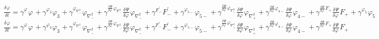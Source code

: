 $\frac{{\delta}^{} \varphi_{{}}}{{\delta} {t}^{}} = {\gamma}^{{{\varphi_{{}}}^{}}}{{\varphi_{{}}}^{}} + {\gamma}^{{{\varphi_{3{}}}^{}}}{{\varphi_{3{}}}^{}} + {\gamma}^{{{{\varphi}_{\scriptscriptstyle{\nabla^2_{-}}}}^{}}}{{{\varphi}_{\scriptscriptstyle{\nabla^2_{-}}}}^{}} + {\gamma}^{{{\frac{{\delta}^{} \Psi}{{\delta} {\varphi_{{}}}^{}}}^{}{{\varphi}_{\scriptscriptstyle{\nabla^2_{-}}}}^{}}}{{\frac{{\delta}^{} \Psi}{{\delta} {\varphi_{{}}}^{}}}^{}{{\varphi}_{\scriptscriptstyle{\nabla^2_{-}}}}^{}} + {\gamma}^{{{{{F}^{\prime}_{-}}}^{}}}{{{{F}^{\prime}_{-}}}^{}} + {\gamma}^{{{{\varphi}_{5{-}}}^{}}}{{{\varphi}_{5{-}}}^{}} + {\gamma}^{{{\frac{{\delta}^{} \Psi}{{\delta} {\varphi_{{}}}^{}}}^{}{\varphi_{\scriptscriptstyle{\nabla^2_{+}}}}^{}}}{{\frac{{\delta}^{} \Psi}{{\delta} {\varphi_{{}}}^{}}}^{}{\varphi_{\scriptscriptstyle{\nabla^2_{+}}}}^{}} + {\gamma}^{{{\frac{{\delta}^{} \Psi}{{\delta} {\varphi_{{}}}^{}}}^{}{{\varphi}_{4{-}}}^{}}}{{\frac{{\delta}^{} \Psi}{{\delta} {\varphi_{{}}}^{}}}^{}{{\varphi}_{4{-}}}^{}} + {\gamma}^{{{\frac{{\delta}^{} \Psi}{{\delta} {\varphi_{{}}}^{}}}^{}{{F_{+}}}^{}}}{{\frac{{\delta}^{} \Psi}{{\delta} {\varphi_{{}}}^{}}}^{}{{F_{+}}}^{}} + {\gamma}^{{{\varphi_{5{}}}^{}}}{{\varphi_{5{}}}^{}}$
$\frac{{\delta}^{} \varphi_{{}}}{{\delta} {t}^{}} = {\gamma}^{{{\varphi_{{}}}^{}}}{{\varphi_{{}}}^{}} + {\gamma}^{{{\varphi_{3{}}}^{}}}{{\varphi_{3{}}}^{}} + {\gamma}^{{{{\varphi}_{\scriptscriptstyle{\nabla^2_{-}}}}^{}}}{{{\varphi}_{\scriptscriptstyle{\nabla^2_{-}}}}^{}} + {\gamma}^{{{\frac{{\delta}^{} \Psi}{{\delta} {\varphi_{{}}}^{}}}^{}{{\varphi}_{\scriptscriptstyle{\nabla^2_{-}}}}^{}}}{{\frac{{\delta}^{} \Psi}{{\delta} {\varphi_{{}}}^{}}}^{}{{\varphi}_{\scriptscriptstyle{\nabla^2_{-}}}}^{}} + {\gamma}^{{{{{F}^{\prime}_{-}}}^{}}}{{{{F}^{\prime}_{-}}}^{}} + {\gamma}^{{{{\varphi}_{5{-}}}^{}}}{{{\varphi}_{5{-}}}^{}} + {\gamma}^{{{\frac{{\delta}^{} \Psi}{{\delta} {\varphi_{{}}}^{}}}^{}{\varphi_{\scriptscriptstyle{\nabla^2_{+}}}}^{}}}{{\frac{{\delta}^{} \Psi}{{\delta} {\varphi_{{}}}^{}}}^{}{\varphi_{\scriptscriptstyle{\nabla^2_{+}}}}^{}} + {\gamma}^{{{\frac{{\delta}^{} \Psi}{{\delta} {\varphi_{{}}}^{}}}^{}{{\varphi}_{4{-}}}^{}}}{{\frac{{\delta}^{} \Psi}{{\delta} {\varphi_{{}}}^{}}}^{}{{\varphi}_{4{-}}}^{}} + {\gamma}^{{{\frac{{\delta}^{} \Psi}{{\delta} {\varphi_{{}}}^{}}}^{}{{F_{+}}}^{}}}{{\frac{{\delta}^{} \Psi}{{\delta} {\varphi_{{}}}^{}}}^{}{{F_{+}}}^{}}$
